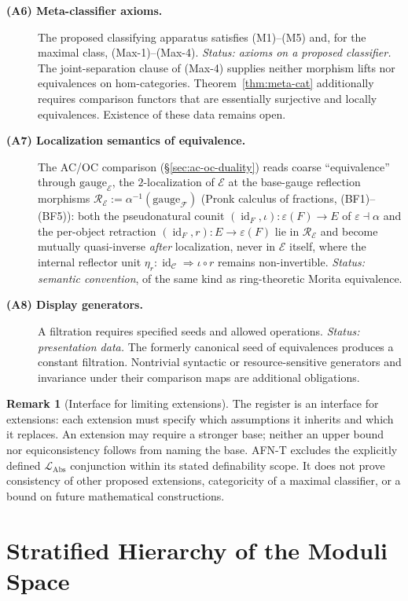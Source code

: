 \documentclass[11pt]{article}
\theoremstyle{plain}
\theoremstyle{definition}
\newtheorem{remark}[theorem]{Remark}
\newcommand{\cF}{\mathcal{F}}
\newcommand{\cC}{\mathcal{C}}
\newcommand{\LAbs}{\mathcal{L}_{\mathrm{Abs}}}
\newcommand{\cE}{\mathcal{E}}
\DeclareMathOperator{\id}{id}
\begin{document}
\begin{description}
\item[\textbf{(A6) Meta-classifier axioms.}] The proposed classifying apparatus satisfies (M1)--(M5) and, for the maximal class, (Max-1)--(Max-4). \emph{Status: axioms on a proposed classifier.} The joint-separation clause of (Max-4) supplies neither morphism lifts nor equivalences on hom-categories. Theorem~\ref{thm:meta-cat} additionally requires comparison functors that are essentially surjective and locally equivalences. Existence of these data remains open.
\item[\textbf{(A7) Localization semantics of equivalence.}] The AC/OC comparison (\S\ref{sec:ac-oc-duality}) reads coarse ``equivalence'' through $\mathrm{gauge}_\cE$, the $2$-localization of $\cE$ at the base-gauge reflection morphisms $\mathcal{R}_\cE := \alpha^{-1}(\mathrm{gauge}_\cF)$ (Pronk calculus of fractions, (BF1)--(BF5)): both the pseudonatural counit $(\id_F, \iota) : \varepsilon(F) \to E$ of $\varepsilon \dashv \alpha$ and the per-object retraction $(\id_F, r) : E \to \varepsilon(F)$ lie in $\mathcal{R}_\cE$ and become mutually quasi-inverse \emph{after} localization, never in $\cE$ itself, where the internal reflector unit $\eta_r : \id_\cC \Rightarrow \iota \circ r$ remains non-invertible. \emph{Status: semantic convention}, of the same kind as ring-theoretic Morita equivalence.
\item[\textbf{(A8) Display generators.}] A filtration requires specified seeds and allowed operations. \emph{Status: presentation data.} The formerly canonical seed of equivalences produces a constant filtration. Nontrivial syntactic or resource-sensitive generators and invariance under their comparison maps are additional obligations.
\end{description}

\begin{remark}[Interface for limiting extensions]\label{rem:register-interface}
The register is an interface for extensions: each extension must specify which assumptions it inherits and which it replaces. An extension may require a stronger base; neither an upper bound nor equiconsistency follows from naming the base. AFN-T excludes the explicitly defined $\LAbs$ conjunction within its stated definability scope. It does not prove consistency of other proposed extensions, categoricity of a maximal classifier, or a bound on future mathematical constructions.
\end{remark}

\section{Stratified Hierarchy of the Moduli Space}\label{sec:hierarchy}
\end{document}
